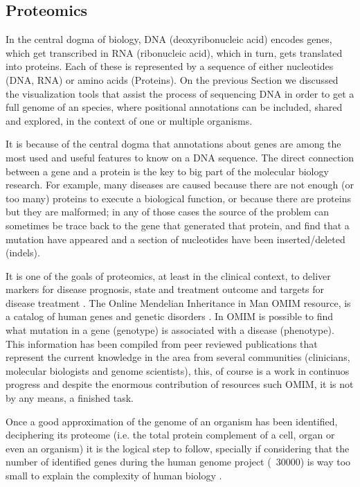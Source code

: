 \subsection{Proteomics}
In the central dogma of biology, DNA (deoxyribonucleic acid) encodes genes, which get transcribed in RNA (ribonucleic acid), which in turn, gets translated into proteins. Each of these is represented by a sequence of either nucleotides (DNA, RNA) or amino acids (Proteins). On the previous Section we discussed the visualization tools that assist the process of sequencing DNA in order to get a full genome of an species, where positional annotations can be included, shared and explored, in the context of one or multiple organisms. 

It is because of the central dogma that annotations about genes are among the most used and useful features to know on a DNA sequence. The direct connection between a gene and a protein is the key to big part of the molecular biology research. For example, many diseases are caused because there are not enough (or too many) proteins to execute a biological function, or because there are proteins but they are malformed; in any of those cases the source of the problem can sometimes be trace back to the gene that generated that protein, and find that a mutation have appeared and a section of nucleotides have been inserted/deleted (indels). 

It is one of the goals of proteomics, at least in the clinical context, to deliver markers for disease prognosis, state and treatment outcome and targets for disease treatment \cite{MIS2007}. The Online Mendelian Inheritance in Man OMIM resource, is a catalog of human genes and genetic disorders \cite{AMB2014}. In OMIM is possible to find what mutation in a gene (genotype) is associated with a disease (phenotype). This information has been compiled from peer reviewed publications that represent the current knowledge in the area from several communities (clinicians, molecular biologists and genome scientists), this, of course is a work in continuos progress and despite the enormous contribution of resources such OMIM, it is not by any means, a finished task.

Once a good approximation of the genome of an organism has been identified, deciphering its proteome (i.e. the total protein complement of a cell, organ or even an organism) it is the logical step to follow, specially if considering that the number of identified genes during the human genome project (~30000) is way too small to explain the complexity of human biology \cite{PAN2008}.

